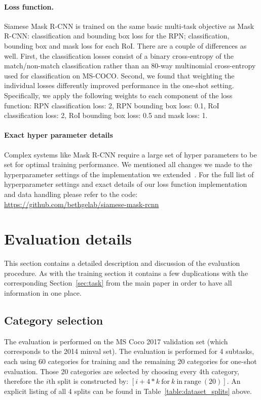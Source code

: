 \documentclass{article}
\newcommand{\coco}{MS-COCO\xspace}
\begin{document}
\paragraph{Loss function.}

Siamese Mask R-CNN is trained on the same basic multi-task objective as Mask R-CNN: classification and bounding box loss for the RPN; classification, bounding box and mask loss for each RoI. There are a couple of differences as well. First, the classification losses consist of a binary cross-entropy of the match/non-match classification rather than an 80-way multinomial cross-entropy used for classification on \coco. Second, we found that weighting the individual losses differently improved performance in the one-shot setting. Specifically, we apply the following weights to each component of the loss function: RPN classification loss: 2, RPN bounding box loss: 0.1, RoI classification loss: 2, RoI bounding box loss: 0.5 and mask loss: 1.




\paragraph{Exact hyper parameter details}
Complex systems like Mask R-CNN require a large set of hyper parameters to be set for optimal training performance. We mentioned all changes we made to the hyperparameter settings of the implementation we extended~\cite{Abdulla2017}. For the full list of hyperparameter settings and exact details of our loss function implementation and data handling please refer to the code: \url{https://github.com/bethgelab/siamese-mask-rcnn} 



\section{Evaluation details}
\label{appendix:evaluation}

This section contains a detailed description and discussion of the evaluation procedure. As with the training section it contains a few duplications with the corresponding Section~\ref{sec:task} from the main paper in order to have all information in one place.

\subsection{Category selection}
The evaluation is performed on the MS Coco 2017 validation set (which corresponds to the 2014 minval set). The evaluation is performed for 4 subtasks, each using 60 categories for training and the remaining 20 categories for one-shot evaluation. Those 20 categories are selected by choosing every 4th category, therefore the $i$th split is constructed by: $[i + 4*k \mathrm{~for~} k \mathrm{~in~range~}(20)]$. An explicit listing of all 4 splits can be found in Table~\ref{table:dataset_splits} above.
\end{document}
